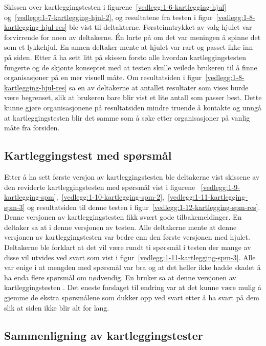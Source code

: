 Skissen over kartleggingstesten i figurene~\ref{vedlegg:1-6-kartlegging-hjul} og~\ref{vedlegg:1-7-kartlegging-hjul-2}, og resultatene fra testen i figur~\ref{vedlegg:1-8-kartlegging-hjul-res} ble vist til deltakterne. Førsteinntrykket av valg-hjulet var forvirrende for noen av deltakerne. Én lurte på om det var meningen å spinne det som et lykkehjul. En annen deltaker mente at hjulet var rart og passet ikke inn på siden. Etter å ha sett litt på skissen forsto alle hvordan kartleggingstesten fungerte og de skjønte konseptet med at testen skulle veilede brukeren til å finne organisasjoner på en mer visuell måte. Om resultatsiden i figur~\ref{vedlegg:1-8-kartlegging-hjul-res} sa en av deltakerne at antallet resultater som vises burde være begrenset, slik at brukeren bare blir vist et lite antall som passer best. Dette kunne gjøre organisasjonene på resultatsiden mindre truende å kontakte og unngå at kartleggingstesten blir det samme som å søke etter organisasjoner på vanlig måte fra forsiden.


\subsection{Kartleggingstest med spørsmål}

Etter å ha sett første versjon av kartleggingstesten ble deltakerne vist skissene av den reviderte kartleggingstesten med spørsmål vist i figurene ~\ref{vedlegg:1-9-kartlegging-spm},~\ref{vedlegg:1-10-kartlegging-spm-2},~\ref{vedlegg:1-11-kartlegging-spm-3} og resultatsiden til denne testen i figur~\ref{vedlegg:1-12-kartlegging-spm-res}. Denne versjonen av kartleggingstesten fikk svært gode tilbakemeldinger. En deltaker sa at  i denne versjonen av testen. Alle deltakerne mente at denne versjonen av kartleggingstesten var bedre enn den første versjonen med hjulet. Deltakerne ble forklart at det vil være rundt ti spørsmål i testen der mange av disse vil utvides ved svart  som vist i figur~\ref{vedlegg:1-11-kartlegging-spm-3}. Alle var enige i at mengden med spørsmål var bra og at det heller ikke hadde skadet å ha enda flere spørsmål om nødvendig. En bruker sa at denne versjonen av kartleggingstesten . Det eneste forslaget til endring var at det kunne være mulig å gjemme de ekstra spørsmålene som dukker opp ved svart  etter å ha svart på dem slik at siden ikke blir alt for lang.


\subsection{Sammenligning av kartleggingstester}

